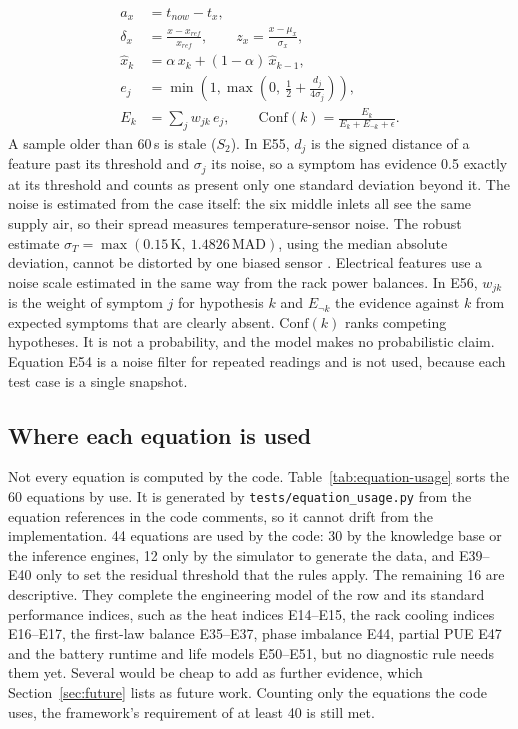 \begin{align}
  a_x &= t_{now} - t_x , \tag{E52}\\
  \delta_x &= \frac{x - x_{ref}}{x_{ref}} , \qquad z_x = \frac{x - \mu_x}{\sigma_x} , \tag{E53}\label{eq:sigma}\\
  \hat x_k &= \alpha\, x_k + (1 - \alpha)\, \hat x_{k-1} , \tag{E54}\\
  e_j &= \min\!\left(1, \max\!\left(0,\ \tfrac{1}{2} + \frac{d_j}{4\sigma_j}\right)\right) , \tag{E55}\label{eq:grade}\\
  E_k &= \textstyle\sum_j w_{jk}\, e_j , \qquad \mathrm{Conf}(k) = \frac{E_k}{E_k + E_{\neg k} + \epsilon} . \tag{E56}
\end{align}
A sample older than 60\,s is stale ($S_2$). In E55, $d_j$ is the signed distance of a feature past its threshold and $\sigma_j$ its noise, so a symptom has evidence 0.5 exactly at its threshold and counts as present only one standard deviation beyond it. The noise is estimated from the case itself: the six middle inlets all see the same supply air, so their spread measures temperature-sensor noise. The robust estimate $\sigma_T = \max(0.15\,\mathrm{K},\ 1.4826\,\mathrm{MAD})$, using the median absolute deviation, cannot be distorted by one biased sensor \parencite{rousseeuw1993}. Electrical features use a noise scale estimated in the same way from the rack power balances. In E56, $w_{jk}$ is the weight of symptom $j$ for hypothesis $k$ and $E_{\neg k}$ the evidence against $k$ from expected symptoms that are clearly absent. $\mathrm{Conf}(k)$ ranks competing hypotheses. It is not a probability, and the model makes no probabilistic claim. Equation E54 is a noise filter for repeated readings and is not used, because each test case is a single snapshot.

\subsection{Where each equation is used}
\label{sec:equation-usage}

Not every equation is computed by the code. Table~\ref{tab:equation-usage} sorts the 60 equations by use. It is generated by \texttt{tests/equation\_usage.py} from the equation references in the code comments, so it cannot drift from the implementation. 44 equations are used by the code: 30 by the knowledge base or the inference engines, 12 only by the simulator to generate the data, and E39--E40 only to set the residual threshold that the rules apply. The remaining 16 are descriptive. They complete the engineering model of the row and its standard performance indices, such as the heat indices E14--E15, the rack cooling indices E16--E17, the first-law balance E35--E37, phase imbalance E44, partial PUE E47 and the battery runtime and life models E50--E51, but no diagnostic rule needs them yet. Several would be cheap to add as further evidence, which Section~\ref{sec:future} lists as future work. Counting only the equations the code uses, the framework's requirement of at least 40 is still met.


